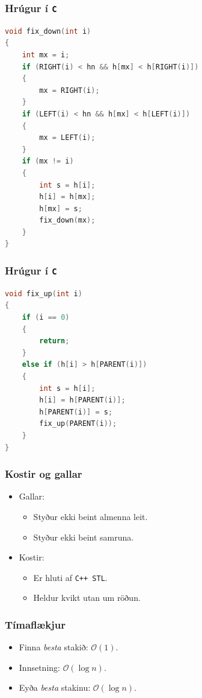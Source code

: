 \documentclass{beamer}
\begin{document}
\begin{frame}[fragile]
	\frametitle{Hrúgur í \texttt{C}}
	\tiny
	\begin{lstlisting}[language=C]
void fix_down(int i)
{
	int mx = i;
	if (RIGHT(i) < hn && h[mx] < h[RIGHT(i)])
	{
		mx = RIGHT(i);
	}
	if (LEFT(i) < hn && h[mx] < h[LEFT(i)])
	{
		mx = LEFT(i);
	}
	if (mx != i)
	{
		int s = h[i];
		h[i] = h[mx];
		h[mx] = s;
		fix_down(mx);
	}
}
\end{lstlisting}
\end{frame}

\begin{frame}[fragile]
	\frametitle{Hrúgur í \texttt{C}}
	\tiny
	\begin{lstlisting}[language=C]
void fix_up(int i)
{
	if (i == 0)
	{
		return;
	}
	else if (h[i] > h[PARENT(i)])
	{
		int s = h[i];
		h[i] = h[PARENT(i)];
		h[PARENT(i)] = s;
		fix_up(PARENT(i));
	}
}
\end{lstlisting}
\end{frame}

\begin{frame}
\frametitle{Kostir og gallar}
\begin{itemize}

\item<1-> Gallar:
	\begin{itemize}
		\item<2-> Styður ekki beint almenna leit.
		\item<3-> Styður ekki beint samruna.
	\end{itemize}
\item<4-> Kostir:
	\begin{itemize}
		\item<5-> Er hluti af \texttt{C++ STL}.
		\item<6-> Heldur kvikt utan um röðun.
	\end{itemize}

\end{itemize}
\end{frame}

\begin{frame}
\frametitle{Tímaflækjur}
\begin{itemize}

\item<1-> Finna \emph{besta} stakið: $\mathcal{O}(1)$.
\item<2-> Innsetning: $\mathcal{O}(\log n)$.
\item<3-> Eyða \emph{besta} stakinu: $\mathcal{O}(\log n)$.

\end{itemize}
\end{frame}
\end{document}
